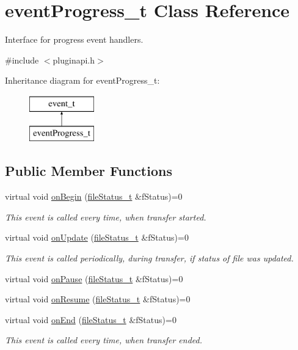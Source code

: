 \hypertarget{classeventProgress__t}{\section{event\-Progress\-\_\-t \-Class \-Reference}
\label{classeventProgress__t}
}


\-Interface for progress event handlers.  




{\ttfamily \#include $<$pluginapi.\-h$>$}

\-Inheritance diagram for event\-Progress\-\_\-t\-:\begin{figure}[H]
\begin{center}
\leavevmode
\includegraphics[height=2.000000cm]{classeventProgress__t}
\end{center}
\end{figure}
\subsection*{\-Public \-Member \-Functions}
\begin{DoxyCompactItemize}
\item 
virtual void \hyperlink{classeventProgress__t_ad53c56ef512c3097bb8bb562b3f5f4e7}{on\-Begin} (\hyperlink{classfileStatus__t}{file\-Status\-\_\-t} \&f\-Status)=0
\begin{DoxyCompactList}\small\item\em \-This event is called every time, when transfer started. \end{DoxyCompactList}\item 
virtual void \hyperlink{classeventProgress__t_a45cd93449caa60707382aadbcb92fb38}{on\-Update} (\hyperlink{classfileStatus__t}{file\-Status\-\_\-t} \&f\-Status)=0
\begin{DoxyCompactList}\small\item\em \-This event is called periodically, during transfer, if status of file was updated. \end{DoxyCompactList}\item 
virtual void \hyperlink{classeventProgress__t_a5388f17e70d3e850a2eb1a8964f5e6b6}{on\-Pause} (\hyperlink{classfileStatus__t}{file\-Status\-\_\-t} \&f\-Status)=0
\item 
virtual void \hyperlink{classeventProgress__t_a8c92bb6b39128cc9561b699650fbbcf1}{on\-Resume} (\hyperlink{classfileStatus__t}{file\-Status\-\_\-t} \&f\-Status)=0
\item 
virtual void \hyperlink{classeventProgress__t_a1d6b642128f364fd964fc16f855187cf}{on\-End} (\hyperlink{classfileStatus__t}{file\-Status\-\_\-t} \&f\-Status)=0
\begin{DoxyCompactList}\small\item\em \-This event is called every time, when transfer ended. \end{DoxyCompactList}\end{DoxyCompactItemize}


